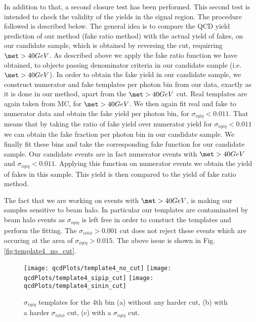 In addition to that, a second closure test has been performed. This second test is intended to check the validity of the yields in the signal region. 
The procedure followed is described below. The general idea is to compare the QCD yield prediction of our method (fake ratio method) with the actual yield of fakes, on our candidate sample, which is obtained 
by reversing the \met cut, requirring $\met > 40 GeV$. As described above we apply the fake ratio function we have obtained, to objects passing denominator criteria 
in our candidate sample (i.e. $\met > 40 GeV$). In order to obtain the fake yield in our candidate sample, we construct 
numerator and fake templates per photon \et bin from our data, exactly as it is done in our method, apart from the $\met > 40 GeV$ cut. Real templates are again taken 
from MC, for $\met > 40 GeV$. We then again fit real and fake to numerator data and obtain the fake yield per photon \et bin, for $\sigma_{i\eta i\eta} < 0.011$. 
That means that by taking the ratio of fake yield over numerator yield for $\sigma_{i\eta i\eta} < 0.011$ we can obtain the fake fraction per photon \et bin in our 
candidate sample. We finally fit these bins and take the corresponding fake function for our candidate sample. Our candidate events are in fact numerator events with 
$\met > 40 GeV$ and $\sigma_{i\eta i\eta} < 0.011$. Applying this function on numerator events we obtain the yield of fakes in this sample. This yield is then compared
to the yield of fake ratio method. 

The fact that we are working on events with $\met > 40 GeV$, is making our samples sensitive to beam halo. In particular our templates are contaminated by beam halo events
as $\sigma_{i\eta i\eta}$ is left free in order to constuct the templates and perform the fitting. The $\sigma_{i\phi i\phi} > 0.001$ cut does not reject these events 
which are occuring at the area of $\sigma_{i\eta i\eta} > 0.015$. The above issue is shown in Fig. \ref{fig:template4_no_cut}.

\begin{figure}[!h]
\begin{center}
{\label{fig:template4_no_cut}\texttt{[image: qcdPlots/template4\_no\_cut]}}
{\label{fig:template4_sipip_cut}\texttt{[image: qcdPlots/template4\_sipip\_cut]}}
{\label{fig:template4_sinin_cut}\texttt{[image: qcdPlots/template4\_sinin\_cut]}}
\caption{$\sigma_{i\eta i\eta}$ templates for the 4th bin (a) without any harder cut, (b) with a harder $\sigma_{i\phi i\phi}$ cut, (c) with a $\sigma_{i\eta i\eta}$ cut.}
\label{fig:qcd_closure2_template4}
\end{center}
\end{figure}

